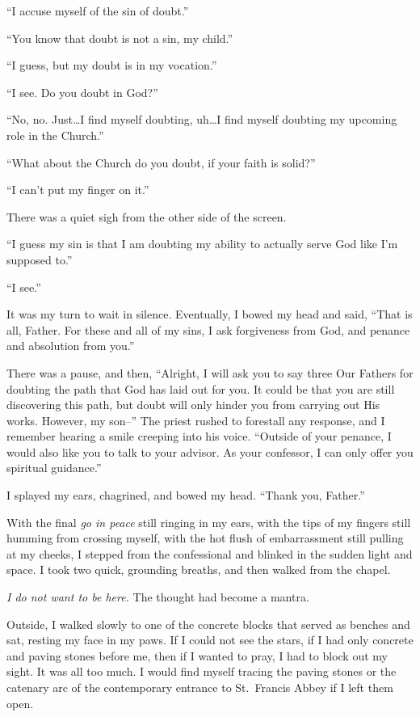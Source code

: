 ``I accuse myself of the sin of doubt.''

``You know that doubt is not a sin, my child.''

``I guess, but my doubt is in my vocation.''

``I see. Do you doubt in God?''

``No, no. Just\ldots I find myself doubting, uh\ldots I find myself doubting my upcoming role in the Church.''

``What about the Church do you doubt, if your faith is solid?''

``I can't put my finger on it.''

There was a quiet sigh from the other side of the screen.

``I guess my sin is that I am doubting my ability to actually serve God like I'm supposed to.''

``I see.''

It was my turn to wait in silence. Eventually, I bowed my head and said, ``That is all, Father. For these and all of my sins, I ask forgiveness from God, and penance and absolution from you.''

There was a pause, and then, ``Alright, I will ask you to say three Our Fathers for doubting the path that God has laid out for you. It could be that you are still discovering this path, but doubt will only hinder you from carrying out His works. However, my son--'' The priest rushed to forestall any response, and I remember hearing a smile creeping into his voice. ``Outside of your penance, I would also like you to talk to your advisor. As your confessor, I can only offer you spiritual guidance.''

I splayed my ears, chagrined, and bowed my head. ``Thank you, Father.''

With the final \emph{go in peace} still ringing in my ears, with the tips of my fingers still humming from crossing myself, with the hot flush of embarrassment still pulling at my cheeks, I stepped from the confessional and blinked in the sudden light and space. I took two quick, grounding breaths, and then walked from the chapel.

\emph{I do not want to be here.} The thought had become a mantra.

Outside, I walked slowly to one of the concrete blocks that served as benches and sat, resting my face in my paws. If I could not see the stars, if I had only concrete and paving stones before me, then if I wanted to pray, I had to block out my sight. It was all too much. I would find myself tracing the paving stones or the catenary arc of the contemporary entrance to St.~Francis Abbey if I left them open.

